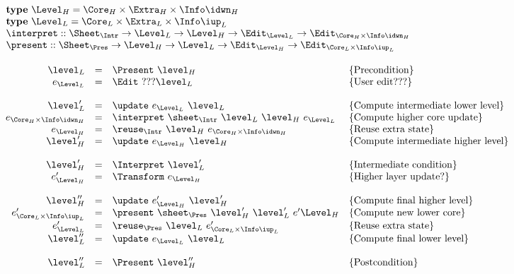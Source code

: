 \begin{small}
 \label{spec:incrementality}
\( \begin{array}{lcl}
\text{\bf type}~\Level_{H}  =  \Core_{H} \times \Extra_{H} \times \Info\idwn_{H}\\
\text{\bf type}~\Level_{L}  =  \Core_{L} \times \Extra_{L} \times \Info\iup_{L}\\
\interpret  ::  \Sheet_{\Intr} \rightarrow \Level_{L} \rightarrow \Level_{H} \rightarrow  \Edit_{\Level_{L}} \rightarrow \Edit_{\Core_{H}\times \Info\idwn_{H}} \\
\present  ::  \Sheet_{\Pres} \rightarrow \Level_{H} \rightarrow \Level_{L}  \rightarrow \Edit_{\Level_{H}} \rightarrow \Edit_{\Core_{L}\times \Info\iup_{L}}\\
\\
\end{array}\) \\
\( \begin{array}{rcll}  
\level_{L} 	& = & \Present~\level_{H}						& \text{\{Precondition\}}\\
e_{\Level_{L}}& = & \Edit~???\level_{L}							& \text{\{User edit???\}}\\
\\
\level'_{L} 	& = & \update~e_{\Level_{L}}~\level_{L}                 & \text{\{Compute intermediate lower level\}}\\
e_{\Core_{H} \times \Info\idwn_{H}}  & = & \interpret~\sheet_{\Intr}~\level_{L}~\level_{H}~e_{\Level_{L}} & \text{\{Compute higher core update\}}\\
e_{\Level_{H}} & = & \reuse_{\Intr}~\level_{H}~e_{\Core_{H}\times \Info\idwn_{H}}     & \text{\{Reuse extra state\}}\\
\level'_{H} & = & \update~e_{\Level_{H}}~\level_{H}                 & \text{\{Compute intermediate higher level\}}\\
\\
\level'_{H} & = & \Interpret~\level'_{L}						& \text{\{Intermediate condition\}}\\
e'_{\Level_{H}} & = & \Transform~e_{\Level_{H}} 			& \text{\{Higher layer update?\}}\\
\\
\level''_{H} & = & \update~e'_{\Level_{H}}~\level'_{H}                 & \text{\{Compute final higher level\}}\\
e'_{\Core_{L}\times \Info\iup_{L}}  & = & \present~\sheet_{\Pres}~\level'_{H}~\level'_{L}~e'{\Level_{H}} & \text{\{Compute new lower core\}}\\
e'_{\Level_{L}} & = & \reuse_{\Pres}~\level_{L}~e'_{\Core_{L}\times \Info\iup_{L}} & \text{\{Reuse extra state\}}\\
\level''_{L} & = & \update~e_{\Level_{L}}~\level_{L}                 & \text{\{Compute final lower level\}}\\
\\
\level''_{L} & = & \Present~\level''_{H}						& \text{\{Postcondition\}}\\
\end{array}\)
\end{small}
